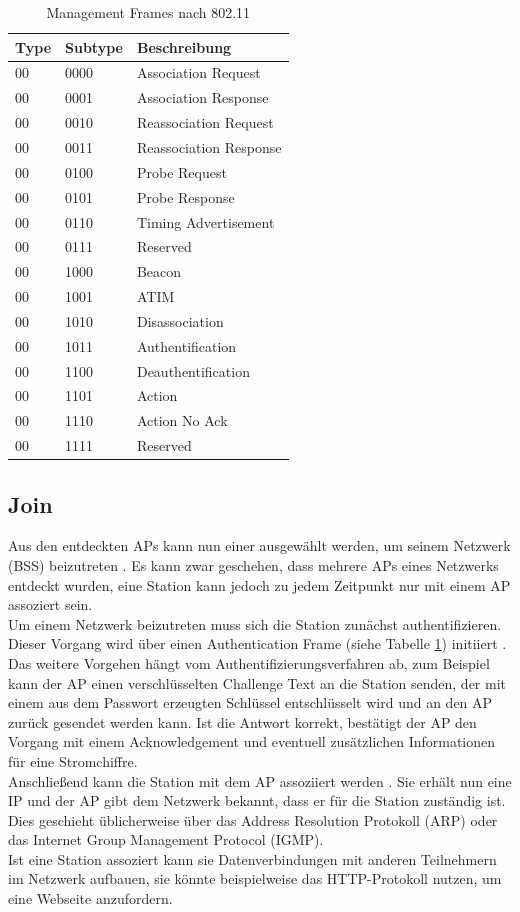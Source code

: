 \begin{table}[h]
	\centering
	\caption{Management Frames nach 802.11 \cite{ieee2012management}}
	\label{table:management}
	\begin{tabular}{l|l|l}
		Type & Subtype & Beschreibung \\
		\hline
		00 & 0000 & Association Request  \\
		00 & 0001 & Association Response  \\
		00 & 0010 & Reassociation Request  \\
		00 & 0011 & Reassociation Response  \\
		00 & 0100 & Probe Request  \\
		00 & 0101 & Probe Response  \\
		00 & 0110 & Timing Advertisement  \\
		00 & 0111 & Reserved  \\
		00 & 1000 & Beacon  \\
		00 & 1001 & ATIM  \\
		00 & 1010 & Disassociation  \\
		00 & 1011 & Authentification  \\
		00 & 1100 & Deauthentification  \\
		00 & 1101 & Action  \\
		00 & 1110 & Action No Ack  \\
		00 & 1111 & Reserved  \\
	\end{tabular}
\end{table}

\subsection{Join}
Aus den entdeckten APs kann nun einer ausgewählt werden, um seinem Netzwerk (BSS) beizutreten \cite{ieee2012join}.
Es kann zwar geschehen, dass mehrere APs eines Netzwerks entdeckt wurden, eine Station kann jedoch zu jedem Zeitpunkt nur mit einem AP assoziert sein. \\
Um einem Netzwerk beizutreten muss sich die Station zunächst authentifizieren. 
Dieser Vorgang wird über einen Authentication Frame (siehe Tabelle \ref{table:management}) initiiert \cite{ieee2012auth}. 
Das weitere Vorgehen hängt vom Authentifizierungsverfahren ab, zum Beispiel kann der AP einen verschlüsselten Challenge Text an die Station senden, der mit einem aus dem Passwort erzeugten Schlüssel entschlüsselt wird und an den AP zurück gesendet werden kann. 
Ist die Antwort korrekt, bestätigt der AP den Vorgang mit einem Acknowledgement und eventuell zusätzlichen Informationen für eine Stromchiffre. \\
Anschließend kann die Station mit dem AP assoziiert werden \cite{ieee2012associate}. 
Sie erhält nun eine IP und der AP gibt dem Netzwerk bekannt, dass er für die Station zuständig ist. 
Dies geschieht üblicherweise über das Address Resolution Protokoll (ARP) oder das Internet Group Management Protocol (IGMP).\\
Ist eine Station assoziert kann sie Datenverbindungen mit anderen Teilnehmern im Netzwerk aufbauen, sie könnte beispielweise das HTTP-Protokoll nutzen, um eine Webseite anzufordern.

